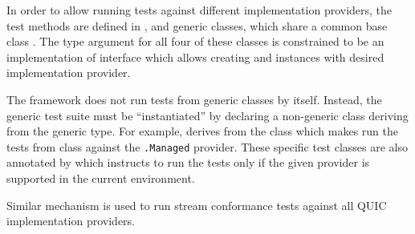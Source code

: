 In order to allow running tests against different implementation providers, the test methods are
defined in \QuicListenerTests{}, \QuicConnectionTests{} and \QuicStreamTests{} generic classes,
which share a common base class \QuicTestBase{}. The type argument for all four of these classes is
constrained to be an implementation of  interface which allows
creating \QuicListener{} and \QuicConnection{} instances with desired implementation provider.

The \xUnit{} framework does not run tests from generic classes by itself. Instead, the generic test
suite must be ``instantiated'' by declaring a non-generic class deriving from the generic type. For
example,  derives from the
 class which makes
\xUnit{} run the tests from \QuicStreamTests{} class against the
\texttt{\QuicImplementationProviders{}.Managed} provider. These specific test classes are also
annotated by  which instructs \xUnit{} to run the tests only if the
given provider is supported in the current environment.

Similar mechanism is used to run stream conformance tests against all QUIC implementation providers.
